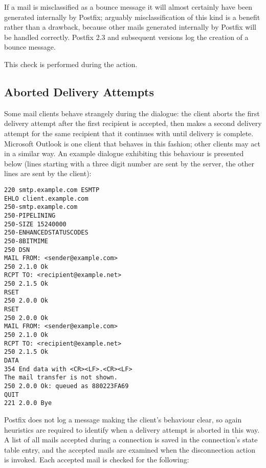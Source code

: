 If a mail is misclassified as a bounce message it will almost certainly
have been generated internally by Postfix; arguably misclassification of
this kind is a benefit rather than a drawback, because other mails
generated internally by Postfix will be handled correctly.  Postfix 2.3 and
subsequent versions log the creation of a bounce message.

This check is performed during the  action.

\subsection{Aborted Delivery Attempts}

\label{aborted delivery attempts}

Some mail clients behave strangely during the  dialogue: the
client aborts the first delivery attempt after the first recipient is
accepted, then makes a second delivery attempt for the same recipient that
it continues with until delivery is complete.  Microsoft Outlook is one
client that behaves in this fashion; other clients may act in a similar
way.  An example dialogue exhibiting this behaviour is presented below
(lines starting with a three digit number are sent by the server, the other
lines are sent by the client):

\begin{verbatim}
220 smtp.example.com ESMTP
EHLO client.example.com
250-smtp.example.com
250-PIPELINING
250-SIZE 15240000
250-ENHANCEDSTATUSCODES
250-8BITMIME
250 DSN
MAIL FROM: <sender@example.com>
250 2.1.0 Ok
RCPT TO: <recipient@example.net>
250 2.1.5 Ok
RSET
250 2.0.0 Ok
RSET
250 2.0.0 Ok
MAIL FROM: <sender@example.com>
250 2.1.0 Ok
RCPT TO: <recipient@example.net>
250 2.1.5 Ok
DATA
354 End data with <CR><LF>.<CR><LF>
The mail transfer is not shown.
250 2.0.0 Ok: queued as 880223FA69
QUIT
221 2.0.0 Bye
\end{verbatim}

Postfix does not log a message making the client's behaviour clear, so
again heuristics are required to identify when a delivery attempt is
aborted in this way.  A list of all mails accepted during a connection is
saved in the connection's state table entry, and the accepted mails are
examined when the disconnection action is invoked.  Each accepted mail is
checked for the following:

